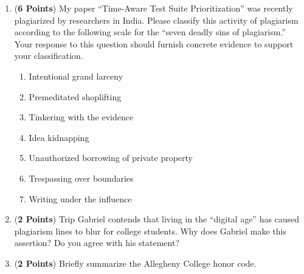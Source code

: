 \documentclass[12pt]{article}
\begin{document}
\begin{enumerate}
\begin{enumerate}

\item ({\bf 6 Points}) My paper ``Time-Aware Test Suite
  Prioritization'' was recently plagiarized by researchers in India.
  Please classify this activity of plagiarism according to the
  following scale for the ``seven deadly sins of plagiarism.''  Your
  response to this question should furnish concrete evidence to
  support your classification.

  \begin{enumerate}

  \item Intentional grand larceny
  \item Premeditated shoplifting
  \item Tinkering with the evidence
  \item Idea kidnapping
  \item Unauthorized borrowing of private property
  \item Trespassing over boundaries
  \item Writing under the influence

  \end{enumerate}

\item ({\bf 2 Points}) Trip Gabriel contends that living in the
  ``digital age'' has caused plagiarism lines to blur for college
  students.  Why does Gabriel make this assertion?  Do you agree with
  his statement?

\item ({\bf 2 Points}) Briefly summarize the Allegheny College honor
  code.

\end{enumerate}

\newpage






\end{enumerate}
\end{document}

